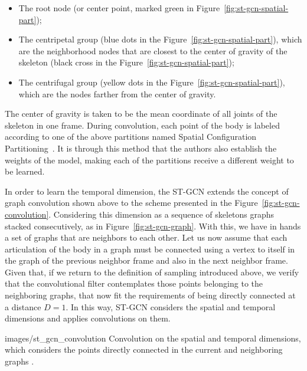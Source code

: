 \begin{itemize}
    \item The root node (or center point, marked green in Figure~\ref{fig:st-gcn-spatial-part});
    \item The centripetal group (blue dots in the Figure~\ref{fig:st-gcn-spatial-part}), which are the neighborhood nodes that are closest to the center of gravity of the skeleton (black cross in the Figure~\ref{fig:st-gcn-spatial-part});
    \item The centrifugal group (yellow dots in the Figure~\ref{fig:st-gcn-spatial-part}), which are the nodes farther from the center of gravity.
\end{itemize}

The center of gravity is taken to be the mean coordinate of all joints of the skeleton in one frame. During convolution, each point of the body is labeled according to one of the above partitions named Spatial Configuration Partitioning~\cite{st-gcn-2018}. It is through this method that the authors also establish the weights of the model, making each of the partitions receive a different weight to be learned.

    
In order to learn the temporal dimension, the ST-GCN extends the concept of graph convolution shown above to the scheme presented in the Figure~\ref{fig:st-gcn-convolution}. Considering this dimension as a sequence of skeletons graphs stacked consecutively, as in Figure~\ref{fig:st-gcn-graph}. With this, we have in hands a set of graphs that are neighbors to each other. Let us now assume that each articulation of the body in a graph must be connected using a vertex to itself in the graph of the previous neighbor frame and also in the next neighbor frame. Given that, if we return to the definition of sampling introduced above, we verify that the convolutional filter contemplates those points belonging to the neighboring graphs, that now fit the requirements of being directly connected at a distance $D = 1$. In this way, ST-GCN considers the spatial and temporal dimensions and applies convolutions on them.

    {images/st_gcn_convolution}
    {Convolution on the spatial and temporal dimensions, which considers the points directly connected in the current and neighboring graphs \cite[p. 3]{st-gcn-2018}.}

